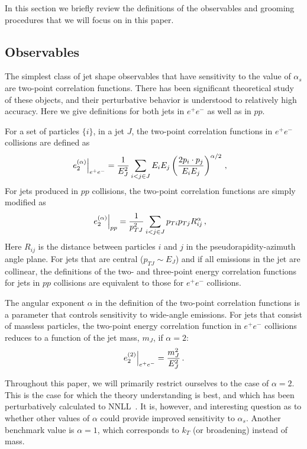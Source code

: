 
In this section we briefly review the definitions of the observables and grooming procedures that we will focus on in this paper.


\subsection{Observables}\label{sec:shape_def}


The simplest class of jet shape observables that have sensitivity to the value of $\alpha_s$ are two-point correlation functions. There has been significant theoretical study of these objects, and their perturbative behavior is understood to relatively high accuracy. Here we give definitions for both jets in $e^+e^-$ as well as in $pp$.


For a set of particles $\{i\}$, in a jet $J$, the two-point correlation functions in $e^+e^-$ collisions are defined as
\begin{align}\label{eq:eee2}
\left.e_{2}^{(\alpha)}\right|_{e^+e^-}&=\frac{1}{E_J^2}\sum_{i<j\in J} E_i E_j\left(
\frac{2p_i\cdot p_j}{E_i E_j}
\right)^{\alpha/2}\,, 
\end{align}
For jets produced in $pp$ collisions, the two-point correlation functions are simply modified as
\begin{align}\label{eq:ppe2}
\left.e_{2}^{(\alpha)}\right|_{pp}&=\frac{1}{p_{TJ}^2}\sum_{i<j\in J} p_{Ti} p_{Tj}R_{ij}^\alpha\,, 
\end{align}
Here $R_{ij}$ is the distance between particles $i$ and $j$ in the pseudorapidity-azimuth angle plane.  For jets that are central ($p_{TJ} \sim E_J$) and if all emissions in the jet are collinear, the definitions of the two- and three-point energy correlation functions for jets in $pp$ collisions are equivalent to those for $e^+e^-$ collisions.

The angular exponent $\alpha$ in the definition of the two-point correlation functions is a parameter that controls sensitivity to wide-angle emissions.  For jets that consist of massless particles, the two-point energy correlation function in $e^+e^-$ collisions reduces to a function of the jet mass, $m_J$, if $\alpha=2$:
\begin{equation}
\left.e_{2}^{(2)}\right|_{e^+e^-} = \frac{m_J^2}{E_J^2}\,.
\end{equation} 

Throughout this paper, we will primarily restrict ourselves to the case of $\alpha=2$. This is the case for which the theory understanding is best, and which has been perturbatively calculated to NNLL~\cite{Frye:2016okc,Frye:2016aiz}. It is, however, and interesting question as to whether other values of $\alpha$ could provide improved sensitivity to $\alpha_s$. Another benchmark value is $\alpha=1$, which corresponds to $k_T$ (or broadening) instead of mass.

